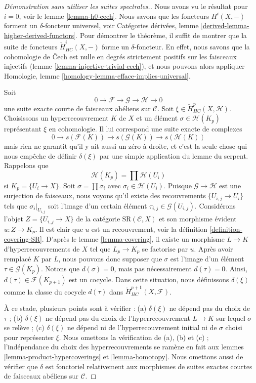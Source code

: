 \begin{proof}[Démonstration sans utiliser les suites spectrales.]
Nous avons vu le résultat pour $i = 0$, voir le lemme \ref{lemma-h0-cech}.
Nous savons que les foncteurs $H^i(X, -)$ forment un $\delta$-foncteur universel, voir
Catégories dérivées, lemme \ref{derived-lemma-higher-derived-functors}.
Pour démontrer le théorème, il suffit de montrer que
la suite de foncteurs $\check{H}^i_{HC}(X, -)$ forme un
$\delta$-foncteur. En effet, nous savons que la cohomologie de {\v C}ech
est nulle en degrés strictement positifs sur les faisceaux injectifs (lemme \ref{lemma-injective-trivial-cech}),
et nous pouvons alors appliquer
Homologie, lemme \ref{homology-lemma-efface-implies-universal}.

\medskip\noindent
Soit
$$
0 \to \mathcal{F} \to \mathcal{G} \to \mathcal{H} \to 0
$$
une suite exacte courte de faisceaux abéliens sur $\mathcal{C}$.
Soit $\xi \in \check{H}^p_{HC}(X, \mathcal{H})$. Choisissons un hyperrecouvrement
$K$ de $X$ et un élément $\sigma \in \mathcal{H}(K_p)$ représentant
$\xi$ en cohomologie. Il lui correspond une suite exacte de
complexes
$$
0 \to s(\mathcal{F}(K)) \to s(\mathcal{G}(K)) \to s(\mathcal{H}(K))
$$
mais rien ne garantit qu'il y ait aussi un zéro à droite, et c'est
la seule chose qui
nous empêche de définir $\delta(\xi)$ par une simple application du
lemme du serpent. Rappelons que
$$
\mathcal{H}(K_p) = \prod \mathcal{H}(U_i)
$$
si $K_p = \{U_i \to X\}$. Soit $\sigma =\prod \sigma_i$ avec
$\sigma_i \in \mathcal{H}(U_i)$. Puisque $\mathcal{G} \to \mathcal{H}$ est
une surjection de faisceaux, nous voyons qu'il existe des recouvrements
$\{U_{i, j} \to U_i\}$ tels que $\sigma_i|_{U_{i, j}}$ soit
l'image d'un certain élément $\tau_{i, j} \in \mathcal{G}(U_{i, j})$.
Considérons l'objet $Z = \{U_{i, j} \to X\}$ de la catégorie
$\text{SR}(\mathcal{C}, X)$ et son morphisme évident
$u : Z \to K_p$. Il est clair que $u$ est un recouvrement, voir la
définition \ref{definition-covering-SR}. D'après le
lemme \ref{lemma-covering}, il
existe un morphisme $L \to K$ d'hyperrecouvrements de $X$ tel que
$L_p \to K_p$ se factorise par $u$. Après avoir remplacé $K$ par $L$,
nous pouvons donc supposer que $\sigma$ est l'image d'un
élément $\tau \in \mathcal{G}(K_p)$. Notons que $d(\sigma) = 0$,
mais pas nécessairement $d(\tau) = 0$. Ainsi, $d(\tau) \in \mathcal{F}(K_{p + 1})$
est un cocycle. Dans cette situation, nous définissons
$\delta(\xi)$ comme la classe du cocycle $d(\tau)$ dans
$\check{H}^{p + 1}_{HC}(X, \mathcal{F})$.

\medskip\noindent
À ce stade, plusieurs points sont à vérifier :
(a) $\delta(\xi)$ ne dépend pas du choix de $\tau$ ;
(b) $\delta(\xi)$ ne dépend pas du choix de l'hyperrecouvrement
$L \to K$ sur lequel $\sigma$ se relève ;
(c) $\delta(\xi)$ ne dépend ni de l'hyperrecouvrement initial ni de
$\sigma$ choisi pour représenter $\xi$. Nous omettons la vérification de
(a), (b) et (c) ; l'indépendance du choix des hyperrecouvrements
se ramène en fait aux lemmes \ref{lemma-product-hypercoverings}
et \ref{lemma-homotopy}. Nous omettons aussi de vérifier que
$\delta$ est fonctoriel relativement aux morphismes de suites exactes
courtes de faisceaux abéliens sur $\mathcal{C}$.


\end{proof}
